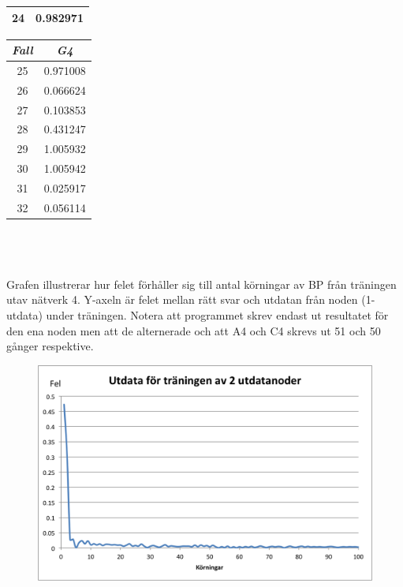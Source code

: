 \documentclass[a4paper,10pt]{article}
\begin{document}
\begin{center}
{\begin{tabular}{|c|c|}
24  & 0.982971 \\ \hline
\end{tabular}
\begin{tabular}{|c|c|}
\hline
\emph{Fall} & \emph{G4}\\ \hline
25  & 0.971008 \\ \hline
26  & 0.066624 \\ \hline
27  & 0.103853 \\ \hline
28  & 0.431247 \\ \hline
29  & 1.005932 \\ \hline
30  & 1.005942 \\ \hline
31  & 0.025917 \\ \hline
32  & 0.056114 \\ \hline
\end{tabular}
	
}
\end{center}\hspace{0pt}\\\\\\

Grafen illustrerar hur felet förhåller sig till antal körningar av BP från träningen utav nätverk 4. Y-axeln är felet mellan rätt svar och utdatan från noden (1-utdata) under träningen. Notera att programmet skrev endast ut resultatet för den ena noden men att de alternerade och att A4 och C4 skrevs ut 51 och 50 gånger respektive.


\begin{figure}[h!]
\includegraphics[width=\textwidth]{2outTR}
\end{figure}\hspace{0pt}\\
\end{document}
